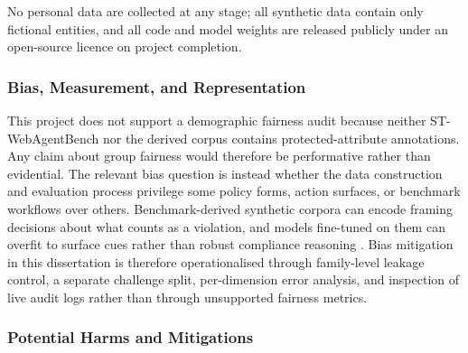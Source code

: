 \documentclass[12pt,a4paper]{article}
\begin{document}
No personal data are collected at any stage; all synthetic data contain
only fictional entities, and all code and model weights are released
publicly under an open-source licence on project completion.

\subsubsection{Bias, Measurement, and Representation}

This project does not support a demographic fairness audit because neither
ST-WebAgentBench nor the derived corpus contains protected-attribute
annotations. Any claim about group fairness would therefore be performative
rather than evidential. The relevant bias question is instead whether the data
construction and evaluation process privilege some policy forms, action
surfaces, or benchmark workflows over others. Benchmark-derived synthetic
corpora can encode framing decisions about what counts as a violation, and
models fine-tuned on them can overfit to surface cues rather than robust
compliance reasoning \citep{jacobs2021measurement,suresh2021harm,li2023synthetic,geirhos2020shortcut}.
Bias mitigation in this dissertation is therefore operationalised through
family-level leakage control, a separate challenge split, per-dimension error
analysis, and inspection of live audit logs rather than through unsupported
fairness metrics.

\subsubsection{Potential Harms and Mitigations}
\end{document}
